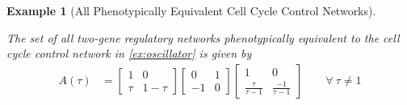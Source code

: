 \documentclass{article}
\newcommand{\plr}[1]{\todo[color=blue!25]{#1}}
\newcommand{\plr}[1]{{\color{blue}\it #1}}
\newcommand{\1}{\mathbbm{1}}
\newtheorem{example}{Example}
\begin{document}
  \begin{example}[All Phenotypically Equivalent Cell Cycle Control Networks] \label{ex:all_osc}

    The set of all two-gene regulatory networks phenotypically equivalent to the cell cycle control network in \ref{ex:oscillator} is given by
    \begin{align*}
      A(\tau) &= \begin{bmatrix} 1 & 0 \\ \tau & 1-\tau \end{bmatrix} \begin{bmatrix} 0 & 1 \\ -1 & 0 \end{bmatrix} \begin{bmatrix} 1 & 0 \\ \frac{\tau}{\tau-1} & \frac{-1}{\tau-1} \end{bmatrix}  \qquad \forall \ \tau \neq 1 %
    \end{align*}
    \begin{figure}[H]
    \centering
\end{figure}
\end{example}
\end{document}
